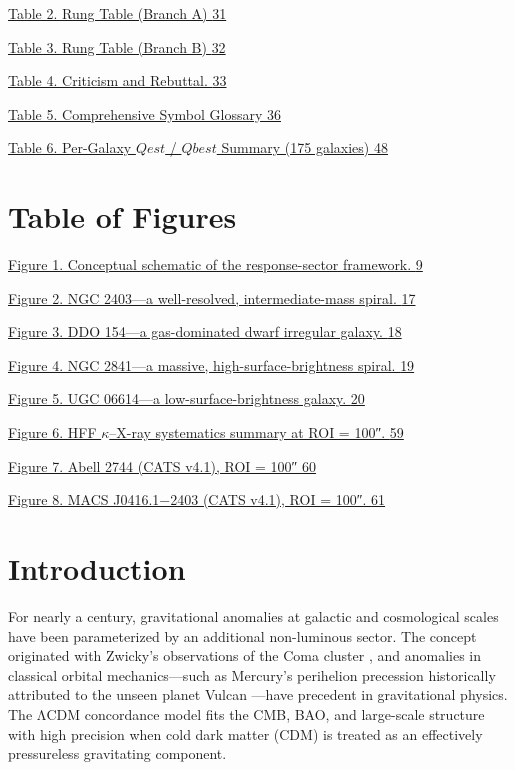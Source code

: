 \documentclass[11pt]{article}
\begin{document}
\hyperref[_Toc222952632]{Table 2. Rung Table (Branch A) \hyperref[_Toc222952632]{31}}

\hyperref[_Toc222952633]{Table 3. Rung Table (Branch B) \hyperref[_Toc222952633]{32}}

\hyperref[_Toc222952634]{Table 4. Criticism and Rebuttal. \hyperref[_Toc222952634]{33}}

\hyperref[_Toc222952635]{Table 5. Comprehensive Symbol Glossary \hyperref[_Toc222952635]{36}}

\hyperref[_Toc222952636]{Table 6. Per-Galaxy \(Qest\) / \(Qbest\) Summary (175 galaxies) \hyperref[_Toc222952636]{48}}

\section{Table of Figures}\label{table-of-figures}

\hyperref[_Toc222952637]{Figure 1. Conceptual schematic of the response-sector framework. \hyperref[_Toc222952637]{9}}

\hyperref[_Toc222952638]{Figure 2. NGC 2403---a well-resolved, intermediate-mass spiral. \hyperref[_Toc222952638]{17}}

\hyperref[_Toc222952639]{Figure 3. DDO 154---a gas-dominated dwarf irregular galaxy. \hyperref[_Toc222952639]{18}}

\hyperref[_Toc222952640]{Figure 4. NGC 2841---a massive, high-surface-brightness spiral. \hyperref[_Toc222952640]{19}}

\hyperref[_Toc222952641]{Figure 5. UGC 06614---a low-surface-brightness galaxy. \hyperref[_Toc222952641]{20}}

\hyperref[_Toc222952642]{Figure 6. HFF \(\kappa\)--X-ray systematics summary at ROI = 100″. \hyperref[_Toc222952642]{59}}

\hyperref[_Toc222952643]{Figure 7. Abell 2744 (CATS v4.1), ROI = 100″ \hyperref[_Toc222952643]{60}}

\hyperref[_Toc222952644]{Figure 8. MACS J0416.1−2403 (CATS v4.1), ROI = 100″. \hyperref[_Toc222952644]{61}}

\fi

\section{Introduction}\label{introduction}

For nearly a century, gravitational anomalies at galactic and cosmological scales have been parameterized by an additional non-luminous sector. The concept originated with Zwicky's observations of the Coma cluster \citep{Zwicky1933Coma}, and anomalies in classical orbital mechanics---such as Mercury's perihelion precession historically attributed to the unseen planet Vulcan \citep{LeVerrier1859Mercury}---have precedent in gravitational physics. The ΛCDM concordance model fits the CMB, BAO, and large-scale structure \citep{Riess2019LMC, Ivezic2019LSST, Euclid2022WideSurvey, Euclid2025Overview} with high precision when cold dark matter (CDM) is treated as an effectively pressureless gravitating component.
\end{document}
